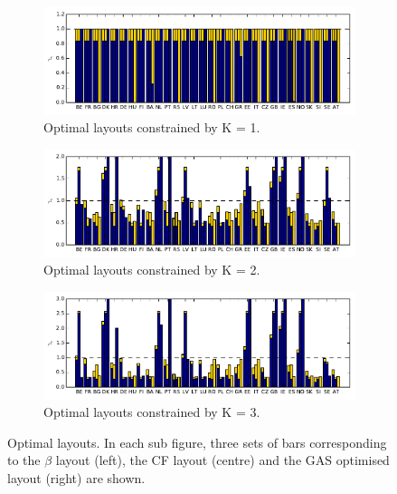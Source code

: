\documentclass[a4paper, 5p, sort&compress]{elsarticle}%
\newcommand{\chromowidth}{1.00 \columnwidth}
\begin{document}
\begin{figure}[p!]
  \centering
  \begin{subfigure}{2\columnwidth}
    \includegraphics[width = \chromowidth, center]{k=1-layouts}
    \caption{Optimal layouts constrained by K = 1.}
    \label{fig:betaOpt}
  \end{subfigure}
  \begin{subfigure}{2\columnwidth}
    \includegraphics[width = \chromowidth, center]{k=2-layouts}
    \caption{Optimal layouts constrained by K = 2.}
    \label{fig:cfMaxOpt}
  \end{subfigure}
  \begin{subfigure}{2\columnwidth}
    \includegraphics[width = \chromowidth, center]{k=3-layouts}
    \caption{Optimal layouts constrained by K = 3.}
    \label{fig:agdOpt}
  \end{subfigure}
  \caption{Optimal layouts. In each sub figure, three sets of bars
    corresponding to the $\beta$ layout (left), the CF layout (centre) and
    the GAS optimised layout (right) are shown.}
  \label{fig:optLayouts}
\end{figure}
\end{document}
